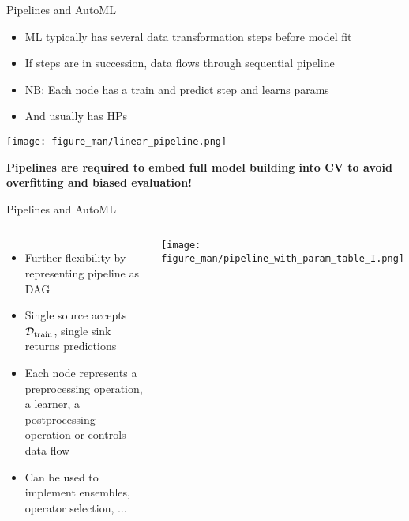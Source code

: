 \documentclass[11pt,compress,t,notes=noshow, xcolor=table]{beamer}
\begin{document}
\begin{vbframe}{Pipelines and AutoML}
\begin{itemize}
    \item ML typically has several data transformation steps before model fit
    \item If steps are in succession, data flows through sequential pipeline
    \item NB: Each node has a train and predict step and learns params
    \item And usually has HPs
\end{itemize}


\vspace{0.5em}

\begin{center}
\texttt{[image: figure\_man/linear\_pipeline.png]}
\end{center}

\vspace{0.5em}

\textbf{Pipelines are required to embed full model building into CV to avoid overfitting and biased evaluation!}
\end{vbframe}

\begin{vbframe}{Pipelines and AutoML}
\begin{columns}
\begin{itemize}
    \item Further flexibility by representing pipeline as DAG
    \item Single source accepts $\mathcal{D}_{\text{train}}$, single sink returns predictions
    \item Each node represents a preprocessing operation, a learner, a postprocessing operation or controls data flow
    \item Can be used to implement ensembles, operator selection, $\ldots$
\end{itemize}
\begin{center}
\texttt{[image: figure\_man/pipeline\_with\_param\_table\_I.png]}
\end{center}
\end{columns}
\end{vbframe}
\end{document}
